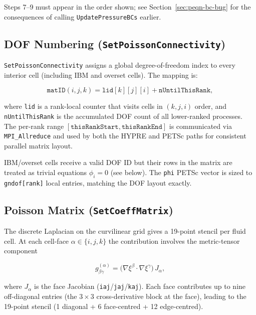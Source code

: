 \documentclass[12pt,a4paper]{article}
\begin{document}
Steps 7--9 must appear in the order shown; see
Section~\ref{sec:peqn-bc-bug} for the consequences of calling
\texttt{UpdatePressureBCs} earlier.

\subsection{DOF Numbering (\texttt{SetPoissonConnectivity})}
\label{sec:peqn-connectivity}

\texttt{SetPoissonConnectivity} assigns a global degree-of-freedom
index to every interior cell (including IBM and overset cells).  The
mapping is:

\begin{equation}
  \texttt{matID}(i,j,k) = \texttt{lid}[k][j][i] + \texttt{nUntilThisRank},
\end{equation}

where \texttt{lid} is a rank-local counter that visits cells in
$(k,j,i)$ order, and \texttt{nUntilThisRank} is the accumulated DOF
count of all lower-ranked processes.  The per-rank range
$[\texttt{thisRankStart},\texttt{thisRankEnd}]$ is communicated via
\texttt{MPI\_Allreduce} and used by both the HYPRE and PETSc paths for
consistent parallel matrix layout.

IBM/overset cells receive a valid DOF ID but their rows in the matrix
are treated as trivial equations $\phi_i = 0$ (see below).  The
\texttt{phi} PETSc vector is sized to \texttt{gndof[rank]} local
entries, matching the DOF layout exactly.

\subsection{Poisson Matrix (\texttt{SetCoeffMatrix})}
\label{sec:peqn-matrix}

The discrete Laplacian on the curvilinear grid gives a 19-point stencil
per fluid cell.  At each cell-face $\alpha\in\{i,j,k\}$ the contribution
involves the metric-tensor component

\begin{equation}
  g^{(\alpha)}_{\beta\gamma}
  = \bigl(\nabla\xi^\beta \cdot \nabla\xi^\gamma\bigr)\,J_\alpha,
\end{equation}

where $J_\alpha$ is the face Jacobian (\texttt{iaj}/\texttt{jaj}/\texttt{kaj}).
Each face contributes up to nine off-diagonal entries (the
$3\times3$ cross-derivative block at the face), leading to the 19-point
stencil (1 diagonal + 6 face-centred + 12 edge-centred).
\end{document}
